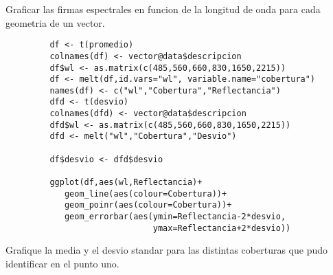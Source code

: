 \begin{exa}
     Graficar las firmas espectrales en funcion de la longitud de onda para cada
     geometria de un vector.
     \begin{lstlisting}
         df <- t(promedio)
         colnames(df) <- vector@data$descripcion
         df$wl <- as.matrix(c(485,560,660,830,1650,2215))
         df <- melt(df,id.vars="wl", variable.name="cobertura")
         names(df) <- c("wl","Cobertura","Reflectancia")
         dfd <- t(desvio)
         colnames(dfd) <- vector@data$descripcion
         dfd$wl <- as.matrix(c(485,560,660,830,1650,2215))
         dfd <- melt("wl","Cobertura","Desvio")

         df$desvio <- dfd$desvio

         ggplot(df,aes(wl,Reflectancia)+
            geom_line(aes(colour=Cobertura))+
            geom_poinr(aes(colour=Cobertura))+
            geom_errorbar(aes(ymin=Reflectancia-2*desvio,
                              ymax=Reflectancia+2*desvio))
     \end{lstlisting}
\end{exa}

\begin{act}
    Grafique la media y el desvio standar para las distintas coberturas que pudo
     identificar en el punto uno. 
\end{act}
